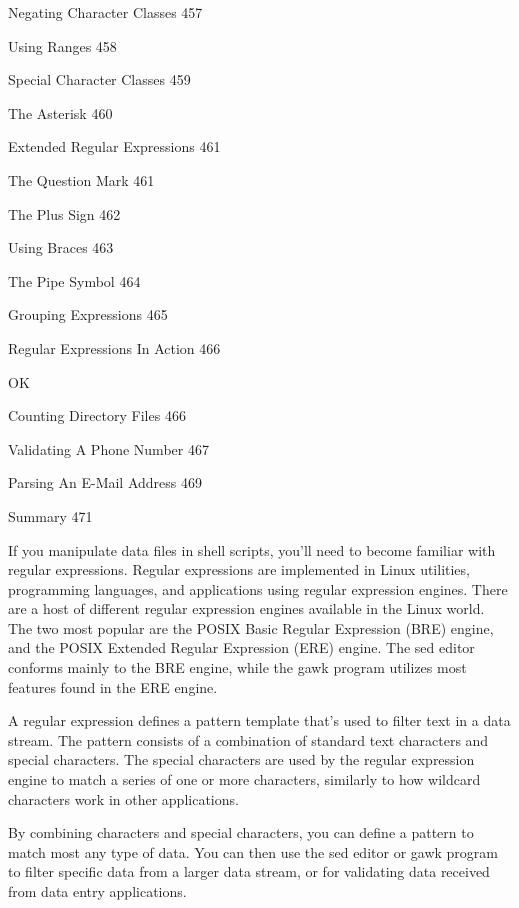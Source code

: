 Negating Character Classes 457



Using Ranges 458



Special Character Classes 459



The Asterisk 460



Extended Regular Expressions 461



The Question Mark 461



The Plus Sign 462



Using Braces 463



The Pipe Symbol 464



Grouping Expressions 465



Regular Expressions In Action 466

OK

Counting Directory Files 466



Validating A Phone Number 467



Parsing An E-Mail Address 469



Summary 471

If you manipulate data files in shell scripts, you'll need to become familiar with regular expressions. Regular expressions are implemented in Linux utilities, programming languages, and applications using regular expression engines. There are a host of different regular expression engines available in the Linux world. The two most popular are the POSIX Basic Regular Expression (BRE) engine, and the POSIX Extended Regular Expression (ERE) engine. The sed editor conforms mainly to the BRE engine, while the gawk program utilizes most features found in the ERE engine.

A regular expression defines a pattern template that's used to filter text in a data stream. The pattern consists of a combination of standard text characters and special characters. The special characters are used by the regular expression engine to match a series of one or more characters, similarly to how wildcard characters work in other applications.

By combining characters and special characters, you can define a pattern to match most any type of data. You can then use the sed editor or gawk program to filter specific data from a larger data stream, or for validating data received from data entry applications.

